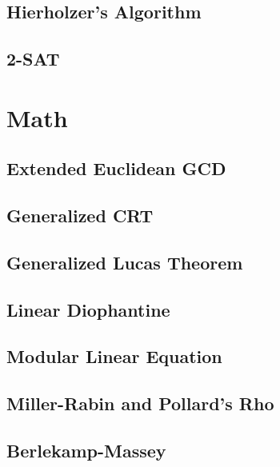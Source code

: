 \subsection{Hierholzer's Algorithm}

\subsection{2-SAT}

\section{Math}
\subsection{Extended Euclidean GCD}

\subsection{Generalized CRT}

\subsection{Generalized Lucas Theorem}

\subsection{Linear Diophantine}

\subsection{Modular Linear Equation}

\subsection{Miller-Rabin and Pollard's Rho}

\subsection{Berlekamp-Massey}

